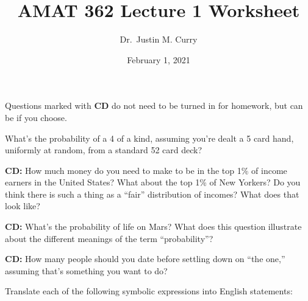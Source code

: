 \documentclass[addpoints,12pt]{exam}
\title{\vspace{-1in} AMAT 362 Lecture 1 Worksheet}
\date{February 1, 2021}
\author{Dr.~Justin M. Curry}
\begin{document}
\maketitle

Questions marked with \textbf{CD} do not need to be turned in for homework, but can be if you choose.

\begin{questions}

\question[2] What's the probability of a 4 of a kind, assuming you're dealt a 5 card hand, uniformly at random, from a standard 52 card deck?


\question[1] \textbf{CD:} How much money do you need to make to be in the top 1\% of income earners in the United States? What about the top 1\% of New Yorkers? Do you think there is such a thing as a ``fair'' distribution of incomes? What does that look like?


\question[1] \textbf{CD:} What's the probability of life on Mars? What does this question illustrate about the different meanings of the term ``probability''?

%
\question[1] \textbf{CD:} How many people should you date before settling down on ``the one,'' assuming that's something you want to do?


\question[6] Translate each of the following symbolic expressions into English statements:

\noaddpoints
{}
\end{questions}
\end{document}
